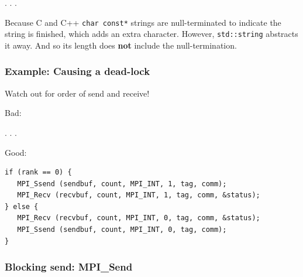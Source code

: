 . . .

Because C and C++ \texttt{char const*} strings are null-terminated to
indicate the string is finished, which adds an extra character. However,
\texttt{std::string} abstracts it away. And so its length does
\textbf{not} include the null-termination.

\subsubsection{Example: Causing a
dead-lock}\label{example-causing-a-dead-lock}

Watch out for order of send and receive!

Bad:

\begin{Shaded}
\begin{Highlighting}[]
 \NormalTok{) \{}
\NormalTok{\} } \NormalTok{\{}
\NormalTok{\}}
\end{Highlighting}
\end{Shaded}

. . .

Good:

\begin{verbatim}
if (rank == 0) {
   MPI_Ssend (sendbuf, count, MPI_INT, 1, tag, comm);
   MPI_Recv (recvbuf, count, MPI_INT, 1, tag, comm, &status);
} else {
   MPI_Recv (recvbuf, count, MPI_INT, 0, tag, comm, &status);
   MPI_Ssend (sendbuf, count, MPI_INT, 0, tag, comm);
}
\end{verbatim}

\subsubsection{Blocking send:
MPI\_Send}\label{blocking-send-mpiux5fsend}

